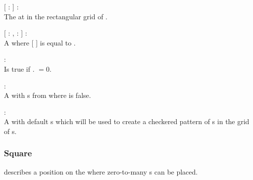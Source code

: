 \begin{dlist}
  \item {}[  :  ] : \\
  The  at  in the rectangular grid of
  .
  
  \item {}[  : ,  :  ] : \\
  A  where [  ] is equal
  to .
  
  \item {} : \\
    Is true if . $= 0$.
  
  \item {} : \\
  A  with s from  where  is false.
  
  \item {} : \\
  A  with default s which will be used to create a checkered pattern of s in the grid of s.
\end{dlist}

\subsubsection{Square}
 describes a position on the  where zero-to-many
s can be placed.

